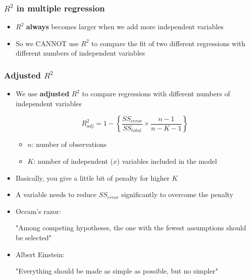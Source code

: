 \documentclass[10pt,article]{article}
\begin{document}
\subsubsection{\(R^2\) in multiple regression}
\label{sec:org4cff366}
\begin{itemize}
\item \(R^2\) \textbf{always} becomes larger when we add more
independent variables
\item So we CANNOT use \(R^2\) to compare the fit of two different regressions
with different numbers of independent variables
\end{itemize}
\subsubsection{Adjusted \(R^{2}\)}
\label{sec:org444853b}
\begin{itemize}
\item We use \textbf{adjusted} \(R^2\) to compare regressions with
different numbers of independent variables

\[  R^2_{adj} = 1 - \left\{ \dfrac{SS_{error}}{SS_{total}} \times
      \dfrac{n-1}{n-K-1} \right\} \]

\begin{itemize}
\item \(n\): number of observations
\item \(K\): number of independent (\(x\)) variables included in the model
\end{itemize}
\end{itemize}

\iffalse
\[  R^2_{adj} = 1 - \left\{ \dfrac{SS_{error}}{SS_{total}} \times
    \dfrac{n-1}{n-K-1} \right\} \]
\fi

\begin{itemize}
\item Basically, you give a little bit of penalty for higher \(K\)
\item A variable needs to reduce \(SS_{error}\) significantly to overcome the
penalty
\end{itemize}

\begin{itemize}
\item Occam's razor: 

"Among competing hypotheses, the one with the fewest assumptions should be selected"
\end{itemize}

\begin{itemize}
\item Albert Einstein:

"Everything should be made as simple as possible, but no simpler"
\end{itemize}
\end{document}
